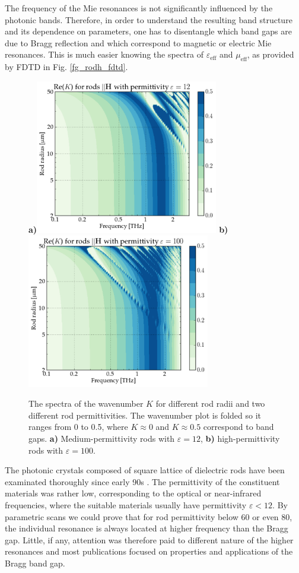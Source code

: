 {{The frequency of the Mie resonances is not significantly influenced by the photonic bands. Therefore, in order to understand the resulting band structure and its dependence on parameters, one has to disentangle which band gaps are due to Bragg reflection and which correspond to magnetic or electric Mie resonances. This is much easier knowing the spectra of $\varepsilon_{\text{eff}}$ and $\mu_{\text{eff}}$, as provided by FDTD in Fig. \ref{fg_rodh_fdtd}.
\begin{figure}[ht] \caption{The spectra of the wavenumber $K$ for different rod radii and two different rod permittivities. The wavenumber plot is folded so it ranges from 0 to 0.5, where $K\approx 0$ and $K\approx 0.5$ correspond to band gaps. \textbf{a)} Medium-permittivity rods with $\varepsilon = 12$, \textbf{b)} high-permittivity rods with $\varepsilon = 100$.  } \label{fg_hbar_radiusscan} \centering 
\textbf{a)}\includegraphics[width=8cm]{img/old/HRods_eps012_radiusscan.pdf}
\textbf{b)}\includegraphics[width=8cm]{img/old/HRods_eps100_radiusscan.pdf}
\end{figure}

The photonic crystals composed of square lattice of dielectric rods have been examinated thoroughly since early 90s \cite{plihal1991two, pendry1992_transfer_matrix}. The permittivity of the constituent materials was rather low, corresponding to the optical or near-infrared frequencies, where the suitable materials usually have permittivity $\varepsilon < 12$. By parametric scans we could prove that for rod permittivity below 60 or even 80, the individual resonance is always located at higher frequency than the Bragg gap. Little, if any, attention was therefore paid to different nature of the higher resonances and most publications focused on properties and applications of the Bragg band gap.

}}
